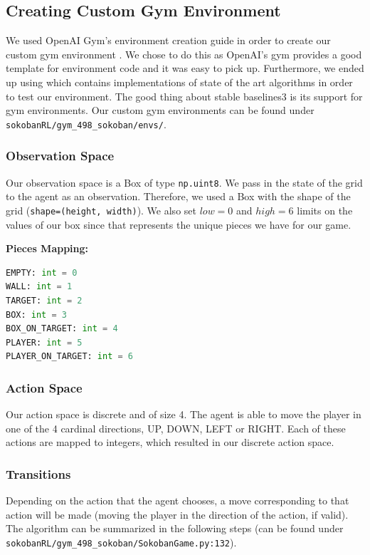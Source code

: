 \documentclass[twoside,11pt]{article}
\begin{document}
\subsection{Creating Custom Gym Environment}
We used OpenAI Gym's environment creation guide in order to create our custom gym environment \cite{openai_2021}. We chose to do this as OpenAI's gym provides a good template for environment code and it was easy to pick up. Furthermore, we ended up using \cite{stable-baselines3} which contains implementations of state of the art algorithms in order to test our environment. The good thing about stable baselines3 is its support for gym environments. Our custom gym environments can be found under \verb|sokobanRL/gym_498_sokoban/envs/|.

\subsubsection{Observation Space}
Our observation space is a Box of type \verb|np.uint8|. We pass in the state of the grid to the agent as an observation. Therefore, we used a Box with the shape of the grid (\verb|shape=(height, width)|). We also set $low=0$ and $high=6$ limits on the values of our box since that represents the unique pieces we have for our game.

\noindent\textbf{Pieces Mapping:}\\
\begin{lstlisting}[language=Python]
EMPTY: int = 0
WALL: int = 1
TARGET: int = 2
BOX: int = 3
BOX_ON_TARGET: int = 4
PLAYER: int = 5
PLAYER_ON_TARGET: int = 6
\end{lstlisting}

\subsubsection{Action Space}
Our action space is discrete and of size 4. The agent is able to move the player in one of the 4 cardinal directions, UP, DOWN, LEFT or RIGHT. Each of these actions are mapped to integers, which resulted in our discrete action space.

\subsubsection{Transitions}
Depending on the action that the agent chooses, a move corresponding to that action will be made (moving the player in the direction of the action, if valid). The algorithm can be summarized in the following steps (can be found under \verb|sokobanRL/gym_498_sokoban/SokobanGame.py:132|). 
\end{document}
